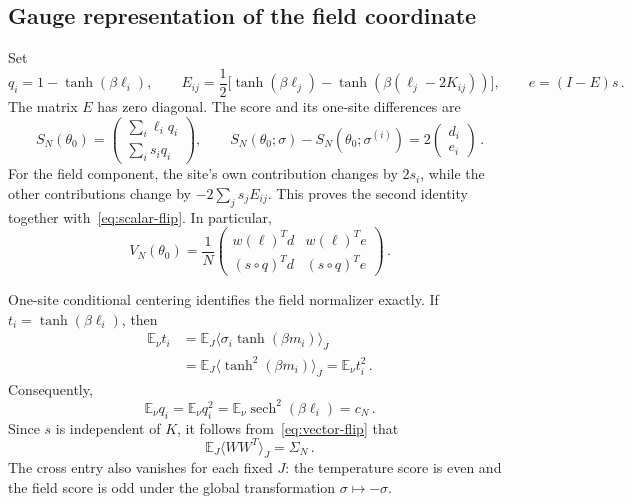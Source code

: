 \documentclass[11pt]{amsart}
\numberwithin{equation}{section}
\theoremstyle{remark}
\newcommand{\E}{\mathbb E}
\newcommand{\sech}{\operatorname{sech}}
\begin{document}
\subsection{Gauge representation of the field coordinate}
Set
\begin{equation}
 q_i=1-\tanh(\beta\ell_i),\qquad
 E_{ij}=\frac12\bigl[\tanh(\beta\ell_j)-\tanh(\beta(\ell_j-2K_{ij}))\bigr],
 \qquad e=(I-E)s\,.
 \label{eq:q-E-e}
\end{equation}
The matrix $E$ has zero diagonal. The score and its one-site differences are
\begin{equation}
 S_N(\theta_0)=\begin{pmatrix}\sum_i\ell_iq_i\\\sum_i s_iq_i\end{pmatrix},
 \qquad
 S_N(\theta_0;\sigma)-S_N(\theta_0;\sigma^{(i)})=2\begin{pmatrix}d_i\\e_i\end{pmatrix}\,.
 \label{eq:vector-flip}
\end{equation}
For the field component, the site's own contribution changes by $2s_i$, while the other contributions change by $-2\sum_js_jE_{ij}$. This proves the second identity together with~\eqref{eq:scalar-flip}. In particular,
\begin{equation}
 V_N(\theta_0)=\frac1N
 \begin{pmatrix}
 w(\ell)^Td&w(\ell)^Te\\
 (s\circ q)^Td&(s\circ q)^Te
 \end{pmatrix}\,.
 \label{eq:V-gauge}
\end{equation}

One-site conditional centering identifies the field normalizer exactly. If $t_i=\tanh(\beta\ell_i)$, then
\begin{align*}
 \E_\nu t_i
 &=\E_J\langle\sigma_i\tanh(\beta m_i)\rangle_J\\
 &=\E_J\langle\tanh^2(\beta m_i)\rangle_J
 =\E_\nu t_i^2\,.
\end{align*}
Consequently,
\begin{equation}
 \E_\nu q_i=\E_\nu q_i^2=\E_\nu\sech^2(\beta\ell_i)=c_N\,.
 \label{eq:field-identities}
\end{equation}
Since $s$ is independent of $K$, it follows from~\eqref{eq:vector-flip} that
\begin{equation}
 \E_J\langle WW^T\rangle_J=\Sigma_N\,.
 \label{eq:score-covariance}
\end{equation}
The cross entry also vanishes for each fixed $J$: the temperature score is even and the field score is odd under the global transformation $\sigma\mapsto-\sigma$.
\end{document}
